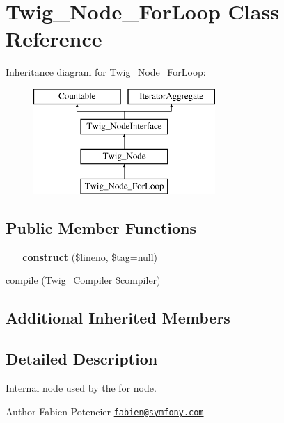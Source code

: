 \hypertarget{class_twig___node___for_loop}{}\section{Twig\+\_\+\+Node\+\_\+\+For\+Loop Class Reference}
\label{class_twig___node___for_loop}
Inheritance diagram for Twig\+\_\+\+Node\+\_\+\+For\+Loop\+:\begin{figure}[H]
\begin{center}
\leavevmode
\includegraphics[height=4.000000cm]{class_twig___node___for_loop}
\end{center}
\end{figure}
\subsection*{Public Member Functions}
\begin{DoxyCompactItemize}
\item 
\hypertarget{class_twig___node___for_loop_a46387baf8018bb8e515955aa8304332b}{}{\bfseries \+\_\+\+\_\+construct} (\$lineno, \$tag=null)\label{class_twig___node___for_loop_a46387baf8018bb8e515955aa8304332b}

\item 
\hyperlink{class_twig___node___for_loop_a4e0faa87c3fae583620b84d3607085da}{compile} (\hyperlink{class_twig___compiler}{Twig\+\_\+\+Compiler} \$compiler)
\end{DoxyCompactItemize}
\subsection*{Additional Inherited Members}


\subsection{Detailed Description}
Internal node used by the for node.

\begin{DoxyAuthor}{Author}
Fabien Potencier \href{mailto:fabien@symfony.com}{\tt fabien@symfony.\+com} 
\end{DoxyAuthor}


